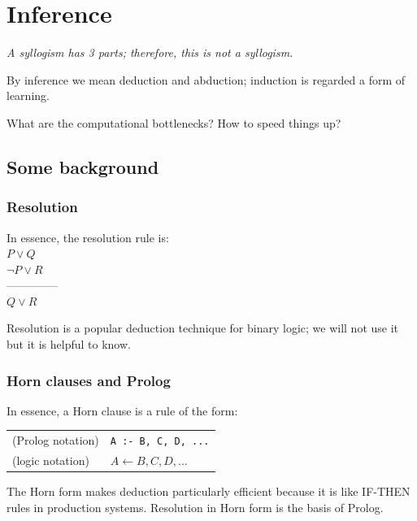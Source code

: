 \chapter{Inference}
\label{ch:inference}
\begin{flushright}
\emph{A syllogism has 3 parts; therefore, this is not a syllogism.}
\end{flushright}
\minitoc

By inference we mean deduction and abduction;  induction is regarded a form of learning.

What are the computational bottlenecks?  How to speed things up?

\section{Some background}

\subsection{Resolution}
\label{sec:resolution}

In essence, the resolution rule is:\\
\hspace*{1cm} $P \vee Q $\\
\hspace*{1cm} $\neg P \vee R$\\
\hspace*{1cm} --------------\\
\hspace*{1cm} $Q \vee R$

Resolution is a popular deduction technique for binary logic;  we will not use it but it is helpful to know.

\subsection{Horn clauses and Prolog}
\label{sec:Prolog-Horn-intro}

In essence, a Horn clause is a rule of the form:\\
\hspace*{1cm} \begin{tabular}{l l}
(Prolog notation) &  \texttt{A :- B, C, D, ...}\\
(logic notation)  &  $A \leftarrow B, C, D, ...$
\end{tabular}

The Horn form makes deduction particularly efficient because it is like IF-THEN rules in production systems.  Resolution in Horn form is the basis of Prolog.

